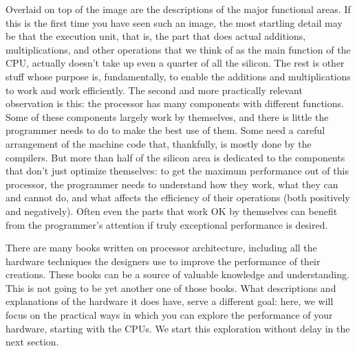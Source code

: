 Overlaid on top of the image are the descriptions of the major functional areas. If this is the first time you have seen such an image, the most startling detail may be that the execution unit, that is, the part that does actual additions, multiplications, and other operations that we think of as the main function of the CPU, actually doesn't take up even a quarter of all the silicon. The rest is other stuff whose purpose is, fundamentally, to enable the additions and multiplications to work and work efficiently. The second and more practically relevant observation is this: the processor has many components with different functions. Some of these components largely work by themselves, and there is little the programmer needs to do to make the best use of them. Some need a careful arrangement of the machine code that, thankfully, is mostly done by the compilers. But more than half of the silicon area is dedicated to the components that don't just optimize themselves: to get the maximum performance out of this processor, the programmer needs to understand how they work, what they can and cannot do, and what affects the efficiency of their operations (both positively and negatively). Often even the parts that work OK by themselves can benefit from the programmer's attention if truly exceptional performance is desired.

There are many books written on processor architecture, including all the hardware techniques the designers use to improve the performance of their creations. These books can be a source of valuable knowledge and understanding. This is not going to be yet another one of those books. What descriptions and explanations of the hardware it does have, serve a different goal: here, we will focus on the practical ways in which you can explore the performance of your hardware, starting with the CPUs. We start this exploration without delay in the next section.













































